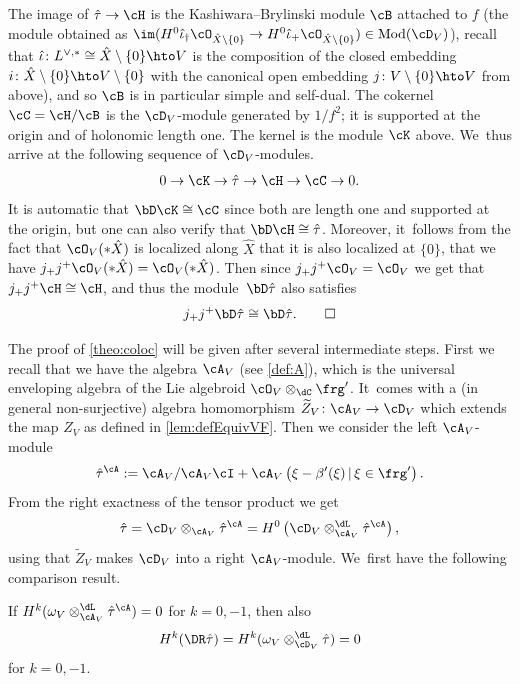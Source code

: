 \begin{exa}
The image of
$\hat{\tau}\to \cH$ is the Kashiwara--Brylinski module $\cB$ attached to
$f$ (\ie the module obtained as
$\im(H^0\hat{\iota}_{\dag}\cO_{\hat{X}\setminus\{0\}}
\to
H^0\hat{\iota}_{+}\cO_{\hat{X}\setminus\{0\}})\in\textup{Mod}(\cD_V)$), recall that
$\hat{\iota} \colon L^{\vee,*}\cong\hat{X}\setminus\{0\}\hto V$ is the composition of the closed embedding $i \colon \hat{X}\setminus\{0\}\hto V\setminus\{0\}$ with the canonical open embedding $j \colon V\setminus\{0\}\hto V$ from above), and so $\cB$ is in particular simple and self-dual. The cokernel $\cC=\cH/\cB$ is the $\cD_V$\nobreakdash-mod\-ule generated by $1/f^2$; it is supported at the origin and of holonomic length one. The kernel is the module $\cK$ above. We~thus arrive at the following sequence of $\cD_V$\nobreakdash-mod\-ules.
\[
0\to \cK \to \hat\tau \to \cH \to \cC \to 0.
\]
It is automatic that $\bD \cK\cong \cC$ since both are length one and supported at the origin, but one can also verify that $\bD \cH \cong \hat\tau$. Moreover, it~follows from the fact that $\cO_V(*\hat{X})$ is localized along $\hat{X}$ that it is also localized at $\{0\}$, \ie that we have $j_+j^+\cO_V(*\hat{X})
=\cO_V(*\hat{X})$. Then since $j_+j^+\cO_V=\cO_V$ we get that $j_+j^+\cH\cong\cH$, and thus the module~$\bD \hat\tau$ also satisfies
\[
j_+j^+ \bD\hat\tau \cong \bD \hat\tau.\qedhere
\]
\end{exa}

The proof of \cref{theo:coloc} will be given after several intermediate steps. First we recall that we have the algebra
$\cA_V$ (see \cref{def:A}), which is the universal enveloping algebra of the Lie algebroid $\cO_V\otimes_\dC \frg'$. It~comes with a (in general non-surjective) algebra homomorphism $\widetilde{Z}_V\colon\cA_V\to \cD_V$ which extends the map $Z_V$ as defined
in \cref{lem:defEquivVF}. Then we consider the left $\cA_V$\nobreakdash-mod\-ule
\[
\hat{\tau}^\cA:=\cA_V/\cA_V \cI+\cA_V\left(\xi-\beta'(\xi)\,|\,\xi\in\frg'\right).
\]
From the right exactness of the tensor product we get
\[
\hat{\tau} = \cD_V\otimes_{\cA_V} \hat{\tau}^\cA =
H^0\left(\cD_V\otimes^\dL_{\cA_V} \hat{\tau}^\cA\right),
\]
using that $\widetilde{Z}_V$ makes $\cD_V$ into a right $\cA_V$\nobreakdash-mod\-ule. We~first have the following comparison result.

\begin{lem}\label{lem:Spect-1}
If $H^k(\omega_V\otimes^\dL_{\cA_V}\hat{\tau}^\cA)=0$ for $k=0,-1$, then also
\[
H^k(\DR \hat\tau)=H^k(\omega_V\otimes^\dL_{\cD_V} \hat{\tau})=0
\]
for $k=0,-1$.
\end{lem}

